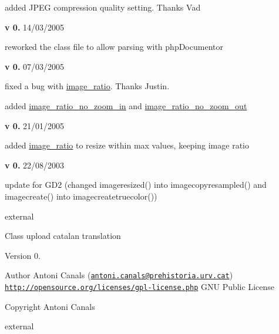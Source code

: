 \begin{DoxyItemize}
\begin{DoxyItemize}
\item added J\+P\+E\+G compression quality setting. Thanks Vad 
\end{DoxyItemize}
\item {\bfseries v 0.} 14/03/2005~\newline

\begin{DoxyItemize}
\item reworked the class file to allow parsing with php\+Documentor 
\end{DoxyItemize}
\item {\bfseries v 0.} 07/03/2005~\newline

\begin{DoxyItemize}
\item fixed a bug with \hyperlink{}{image\+\_\+ratio}. Thanks Justin.~\newline

\item added \hyperlink{}{image\+\_\+ratio\+\_\+no\+\_\+zoom\+\_\+in} and \hyperlink{}{image\+\_\+ratio\+\_\+no\+\_\+zoom\+\_\+out}  
\end{DoxyItemize}
\item {\bfseries v 0.} 21/01/2005~\newline

\begin{DoxyItemize}
\item added \hyperlink{}{image\+\_\+ratio} to resize within max values, keeping image ratio 
\end{DoxyItemize}
\item {\bfseries v 0.} 22/08/2003~\newline

\begin{DoxyItemize}
\item update for G\+D2 (changed imageresized() into imagecopyresampled() and imagecreate() into imagecreatetruecolor()) 
\end{DoxyItemize}
\end{DoxyItemize}

external

Class upload catalan translation

\begin{DoxyVersion}{Version}
0. 
\end{DoxyVersion}
\begin{DoxyAuthor}{Author}
Antoni Canals (\href{mailto:antoni.canals@prehistoria.urv.cat}{\tt antoni.\+canals@prehistoria.\+urv.\+cat})  \href{http://opensource.org/licenses/gpl-license.php}{\tt http\+://opensource.\+org/licenses/gpl-\/license.\+php} G\+N\+U Public License 
\end{DoxyAuthor}
\begin{DoxyCopyright}{Copyright}
Antoni Canals
\end{DoxyCopyright}
external

